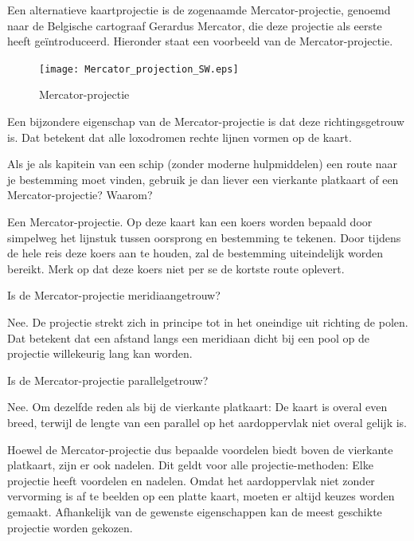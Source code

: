 Een alternatieve kaartprojectie is de zogenaamde Mercator-projectie, genoemd naar de Belgische cartograaf Gerardus Mercator, die deze projectie als eerste heeft ge\"introduceerd. Hieronder staat een voorbeeld van de Mercator-projectie.

\begin{figure}[h]
	\centering
	\texttt{[image: Mercator\_projection\_SW.eps]}
	\caption{Mercator-projectie}
	\label{fig_mercator}
\end{figure}
Een bijzondere eigenschap van de Mercator-projectie is dat deze richtingsgetrouw is. Dat betekent dat alle loxodromen rechte lijnen vormen op de kaart.

\begin{opgave}
	Als je als kapitein van een schip (zonder moderne hulpmiddelen) een route naar je bestemming moet vinden, gebruik je dan liever een vierkante platkaart of een Mercator-projectie? Waarom?
	\begin{antwoord}
		Een Mercator-projectie. Op deze kaart kan een koers worden bepaald door simpelweg het lijnstuk tussen oorsprong en bestemming te tekenen. Door tijdens de hele reis deze koers aan te houden, zal de bestemming uiteindelijk worden bereikt. Merk op dat deze koers niet per se de kortste route oplevert.
	\end{antwoord}
\end{opgave}

\begin{opgave}
	\begin{subopgave}
		Is de Mercator-projectie meridiaangetrouw?
		\begin{antwoord}
			Nee. De projectie strekt zich in principe tot in het oneindige uit richting de polen. Dat betekent dat een afstand langs een meridiaan dicht bij een pool op de projectie willekeurig lang kan worden.
		\end{antwoord}
	\end{subopgave}
	\begin{subopgave}
		Is de Mercator-projectie parallelgetrouw?
		\begin{antwoord}
			Nee. Om dezelfde reden als bij de vierkante platkaart: De kaart is overal even breed, terwijl de lengte van een parallel op het aardoppervlak niet overal gelijk is.
		\end{antwoord}
	\end{subopgave}
\end{opgave}

Hoewel de Mercator-projectie dus bepaalde voordelen biedt boven de vierkante platkaart, zijn er ook nadelen. Dit geldt voor alle projectie-methoden: Elke projectie heeft voordelen en nadelen. Omdat het aardoppervlak niet zonder vervorming is af te beelden op een platte kaart, moeten er altijd keuzes worden gemaakt. Afhankelijk van de gewenste eigenschappen kan de meest geschikte projectie worden gekozen.

